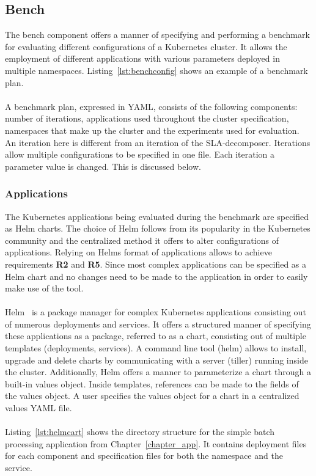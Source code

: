 \subsection{Bench}
The bench component offers a manner of specifying and performing a benchmark for evaluating different configurations of a Kubernetes cluster. It allows the employment of different applications with various parameters deployed in multiple namespaces. Listing~\ref{lst:benchconfig} shows an example of a benchmark plan.\\\\
A benchmark plan, expressed in YAML, consists of the following components: number of iterations, applications used throughout the cluster specification,  namespaces that make up the cluster and the  experiments used for evaluation. An iteration here is different from an iteration of the SLA-decomposer. Iterations allow multiple configurations to be specified in one file. Each iteration a parameter value is changed. This is discussed below.
\subsubsection{Applications}
The Kubernetes applications being evaluated during the benchmark are specified as Helm charts. The choice of Helm follows from its popularity in the Kubernetes community and the centralized method it offers to alter configurations of applications. Relying on Helms format of applications allows to achieve requirements \textbf{R2} and \textbf{R5}. Since most complex applications can be specified as a Helm chart and no changes need to be made to the application in order to easily make use of the tool.\\\\
Helm~\cite{helm} is a package manager for complex Kubernetes applications consisting out of numerous deployments and services. It offers a structured manner of specifying these applications as a package, referred to as a chart,  consisting out of multiple templates (deployments, services). A command line tool (helm) allows to install, upgrade and delete charts by communicating with a  server (tiller) running inside the cluster. Additionally, Helm offers a manner to parameterize a chart through a built-in values object. Inside templates, references can be made to the fields of the values object. A user specifies the values object for a chart in a centralized values YAML file. \\\\
Listing~\ref{lst:helmcart} shows the directory structure for the simple batch processing application from Chapter~\ref{chapter_app}. It contains deployment files for each component and specification files for both the namespace and the service. 

